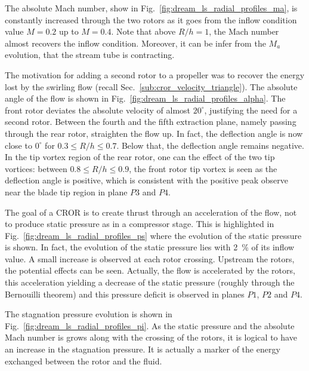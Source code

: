 The absolute Mach number, show in 
Fig.~\ref{fig:dream_ls_radial_profiles_ma}, is constantly increased through
the two rotors as it goes from the inflow condition value $M=0.2$
up to $M=0.4$. Note that above $R/h=1$, the Mach number
almost recovers the inflow condition. Moreover, it can be infer from the
$M_a$ evolution, that the stream tube is contracting.

The motivation for adding a second rotor to a propeller
was to recover the energy lost by the swirling flow
(recall Sec.~\ref{sub:cror_velocity_triangle}).
The absolute angle of the flow is shown in 
Fig.~\ref{fig:dream_ls_radial_profiles_alpha}. The front rotor
deviates the absolute velocity of almost $20^\circ$, justifying the need
for a second rotor. Between the fourth and the fifth extraction plane, namely
passing through the rear rotor, straighten the flow up. In fact,
the deflection angle is now close to $0^\circ$ for $0.3 \leq R/h \leq 0.7$.
Below that, the deflection angle remains negative. In the tip vortex region
of the rear rotor, one can the effect of the two tip vortices: between 
$0.8 \leq R/h \leq 0.9$, the front rotor tip vortex is seen as the 
deflection angle is positive, which is consistent with the positive
peak observe near the blade tip region in plane $P3$ and $P4$.

The goal of a CROR is to create thrust through an acceleration of 
the flow, not to produce static pressure as in a compressor stage.
This is highlighted in Fig.~\ref{fig:dream_ls_radial_profiles_ps}
where the evolution of the static pressure is shown.
In fact, the evolution of the static pressure lies with 2~\%
of its inflow value. A small increase is observed at each
rotor crossing. Upstream the rotors, the potential effects can
be seen. Actually, the flow is accelerated by the rotors, this acceleration
yielding a decrease of the static pressure 
(roughly through the Bernouilli theorem) and this pressure deficit is observed in
planes $P1$, $P2$ and $P4$.

The stagnation pressure evolution is shown in 
Fig.~\ref{fig:dream_ls_radial_profiles_pi}. As the static pressure
and the absolute Mach number is grows along with the crossing of the rotors,
it is logical to have an increase in the stagnation pressure.
It is actually a marker of the energy exchanged between the rotor
and the fluid.

